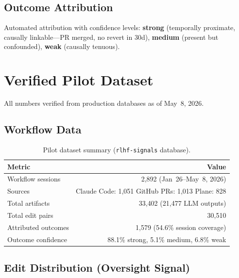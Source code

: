 \documentclass[11pt]{article}
\begin{document}
\subsection{Outcome Attribution}
\label{sec:outcome-attribution}

Automated attribution with confidence levels: \textbf{strong} (temporally proximate, causally linkable---PR merged, no revert in 30d), \textbf{medium} (present but confounded), \textbf{weak} (causally tenuous).


\section{Verified Pilot Dataset}
\label{sec:dataset}

All numbers verified from production databases as of May~8, 2026.

\subsection{Workflow Data}

\begin{table}[h]
\centering
\caption{Pilot dataset summary (\texttt{rlhf-signals} database).}
\label{tab:dataset-summary}
\begin{tabular}{@{}lr@{}}
\toprule
\textbf{Metric} & \textbf{Value} \\
\midrule
Workflow sessions & 2{,}892 (Jan~26--May~8, 2026) \\
\quad Sources & Claude Code: 1{,}051 \textbullet{} GitHub PRs: 1{,}013 \textbullet{} Plane: 828 \\
Total artifacts & 33{,}402 (21{,}477 LLM outputs) \\
Total edit pairs & 30{,}510 \\
Attributed outcomes & 1{,}579 (54.6\% session coverage) \\
Outcome confidence & 88.1\% strong, 5.1\% medium, 6.8\% weak \\
\bottomrule
\end{tabular}
\end{table}

\subsection{Edit Distribution (Oversight Signal)}
\end{document}
